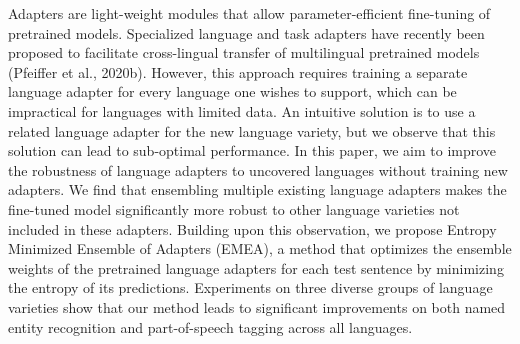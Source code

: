 Adapters are light-weight modules that allow parameter-efficient fine-tuning of pretrained models. Specialized language and task adapters have recently been proposed to facilitate cross-lingual transfer of multilingual pretrained models (Pfeiffer et al., 2020b). However, this approach requires training a separate language adapter for every language one wishes to support, which can be impractical for languages with limited data. An intuitive solution is to use a related language adapter for the new language variety, but we observe that this solution can lead to sub-optimal performance. In this paper, we aim to improve the robustness of language adapters to uncovered languages without training new adapters. We find that ensembling multiple existing language adapters makes the fine-tuned model significantly more robust to other language varieties not included in these adapters. Building upon this observation, we propose Entropy Minimized Ensemble of Adapters (EMEA), a method that optimizes the ensemble weights of the pretrained language adapters for each test sentence by minimizing the entropy of its predictions. Experiments on three diverse groups of language varieties show that our method leads to significant improvements on both named entity recognition and part-of-speech tagging across all languages.
